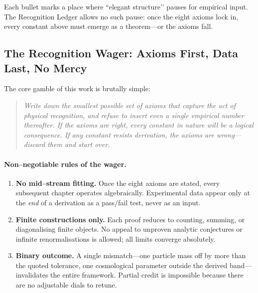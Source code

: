 \documentclass[11pt]{article}
\begin{document}
Each bullet marks a place where “elegant structure’’ pauses for empirical input.  The Recognition Ledger allows no such pause: once the eight axioms lock in, every constant above must emerge as a theorem—or the axioms fall.

\subsection{The Recognition Wager: Axioms First, Data Last, No Mercy}
\label{subsec:recognition-wager}

The core gamble of this work is brutally simple:

\begin{quote}
\textit{Write down the smallest possible set of axioms that capture the act of physical recognition, and refuse to insert even a single empirical number thereafter.  If the axioms are right, every constant in nature will be a logical consequence.  If any constant resists derivation, the axioms are wrong—discard them and start over.}
\end{quote}

\paragraph{Non–negotiable rules of the wager.}
\begin{enumerate}
  \item \textbf{No mid–stream fitting.}  Once the eight axioms are stated, every subsequent chapter operates algebraically.  Experimental data appear only at the \emph{end} of a derivation as a pass/fail test, never as an input.
  \item \textbf{Finite constructions only.}  Each proof reduces to counting, summing, or diagonalising finite objects.  No appeal to unproven analytic conjectures or infinite renormalisations is allowed; all limits converge absolutely.
  \item \textbf{Binary outcome.}  A single mismatch—one particle mass off by more than the quoted tolerance, one cosmological parameter outside the derived band—invalidates the entire framework.  Partial credit is impossible because there are no adjustable dials to retune.
\end{enumerate}
\end{document}
